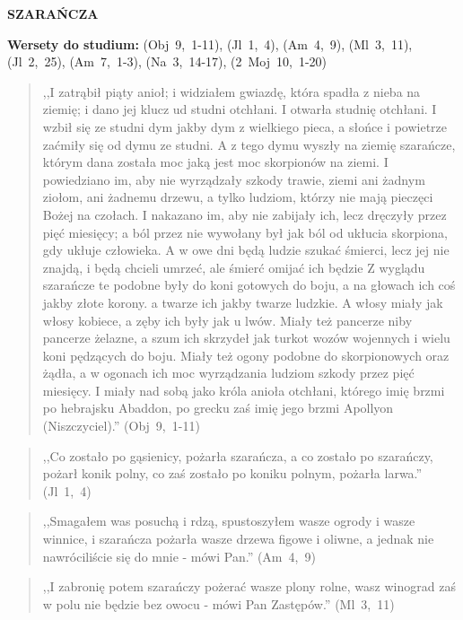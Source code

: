 \documentclass[10pt,a4paper,oneside]{article}
\begin{document}
\centerline{\textbf{\MakeUppercase{Szarańcza}}}
\begin{center}
\textbf{Wersety do studium:} \mbox{(Obj 9, 1-11)}, \mbox{(Jl 1, 4)}, \mbox{(Am 4, 9)}, \mbox{(Ml 3, 11)}, \mbox{(Jl 2, 25)}, \mbox{(Am 7, 1-3)}, \mbox{(Na 3, 14-17)}, \mbox{(2 Moj 10, 1-20)}
\end{center}
\begin{quote}
,,I zatrąbił piąty anioł; i widziałem gwiazdę, która spadła z nieba na ziemię; i dano jej klucz ud studni otchłani. I otwarła studnię otchłani. I wzbił się ze studni dym jakby dym z wielkiego pieca, a słońce i powietrze zaćmiły się od dymu ze studni. A z tego dymu wyszły na ziemię szarańcze, którym dana została moc jaką jest moc skorpionów na ziemi. I powiedziano im, aby nie wyrządzały szkody trawie, ziemi ani żadnym ziołom, ani żadnemu drzewu, a tylko ludziom, którzy nie mają pieczęci Bożej na czołach. I nakazano im, aby nie zabijały ich, lecz dręczyły przez pięć miesięcy; a ból przez nie wywołany był jak ból od ukłucia skorpiona, gdy ukłuje człowieka. A w owe dni będą ludzie szukać śmierci, lecz jej nie znajdą, i będą chcieli umrzeć, ale śmierć omijać ich będzie Z wyglądu szarańcze te podobne były do koni gotowych do boju, a na głowach ich coś jakby złote korony. a twarze ich jakby twarze ludzkie. A włosy miały jak włosy kobiece, a zęby ich były jak u lwów. Miały też pancerze niby pancerze żelazne, a szum ich skrzydeł jak turkot wozów wojennych i wielu koni pędzących do boju. Miały też ogony podobne do skorpionowych oraz żądła, a w ogonach ich moc wyrządzania ludziom szkody przez pięć miesięcy. I miały nad sobą jako króla anioła otchłani, którego imię brzmi po hebrajsku Abaddon, po grecku zaś imię jego brzmi Apollyon (Niszczyciel).'' \mbox{(Obj 9, 1-11)}
\end{quote}
\begin{quote}
,,Co zostało po gąsienicy, pożarła szarańcza, a co zostało po szarańczy, pożarł konik polny, co zaś zostało po koniku polnym, pożarła larwa.'' \mbox{(Jl 1, 4)}
\end{quote}
\begin{quote}
,,Smagałem was posuchą i rdzą, spustoszyłem wasze ogrody i wasze winnice, i szarańcza pożarła wasze drzewa figowe i oliwne, a jednak nie nawróciliście się do mnie - mówi Pan.'' \mbox{(Am 4, 9)}
\end{quote}
\begin{quote}
,,I zabronię potem szarańczy pożerać wasze plony rolne, wasz winograd zaś w polu nie będzie bez owocu - mówi Pan Zastępów.'' \mbox{(Ml 3, 11)}
\end{quote}
\end{document}
